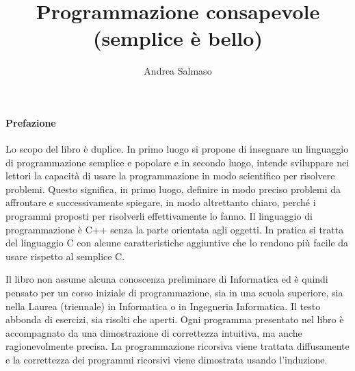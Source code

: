 \documentclass[a4paper,12pt]{book}
\begin{document}
\author{Andrea Salmaso}
\title{Programmazione consapevole \\ (semplice è bello)}
\maketitle

\tableofcontents

\newpage

\paragraph{Prefazione}
Lo scopo del libro è duplice.
In primo luogo si propone di insegnare un linguaggio di programmazione semplice e popolare e in secondo luogo, intende sviluppare nei lettori la capacità di usare la programmazione in modo scientifico per risolvere problemi.
Questo significa, in primo luogo, definire in modo preciso  problemi da affrontare e successivamente spiegare, in modo altrettanto chiaro, perché i programmi proposti per risolverli effettivamente lo fanno.
Il linguaggio di programmazione è C++ senza la parte orientata agli oggetti.
In pratica si tratta del linguaggio C con alcune caratteristiche aggiuntive che lo rendono più facile da usare rispetto al semplice C.

Il libro non assume alcuna conoscenza preliminare di Informatica ed è quindi pensato per un corso iniziale di programmazione, sia in una scuola superiore, sia nella Laurea (triennale) in Informatica o in Ingegneria Informatica.
Il testo abbonda di esercizi, sia risolti che aperti. Ogni programma presentato nel libro è accompagnato da una dimostrazione di correttezza intuitiva, ma anche ragionevolmente precisa.
La programmazione ricorsiva viene trattata diffusamente e la correttezza dei programmi ricorsivi viene dimostrata usando l'induzione.

























\end{document}

